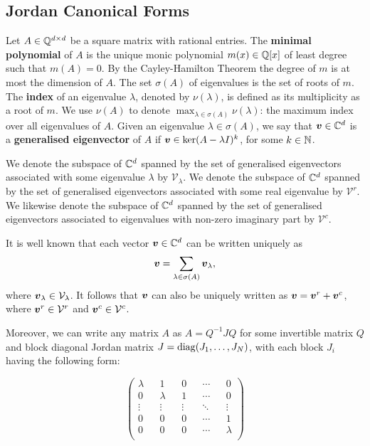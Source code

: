 \subsection{Jordan Canonical Forms}

Let $A \in \mathbb{Q}^{d \times d}$ be a square matrix with rational
entries.  The \textbf{minimal polynomial} of $A$ is the unique monic
polynomial $m(x) \in \mathbb{Q}[x]$ of least degree such that
$m(A)=0$.  By the Cayley-Hamilton Theorem the degree of $m$ is at most
the dimension of $A$. The set $\sigma(A)$ of eigenvalues is the set of
roots of $m$.  The \textbf{index} of an eigenvalue $\lambda$, denoted
by $\nu(\lambda)$, is defined as its multiplicity as a root of $m$. We
use $\nu(A)$ to denote $\max_{\lambda\in\sigma(A)} \nu(\lambda)$: the
maximum index over all eigenvalues of $A$.  Given an eigenvalue
$\lambda \in \sigma(A)$, we say that $\boldsymbol{v} \in \mathbb{C}^{d}$
is a \textbf{generalised eigenvector} of $A$ if
$\boldsymbol{v}\in \ker(A-\lambda I)^{k}$, for some $k\in\mathbb{N}$.

We denote the subspace of $\mathbb{C}^{d}$ spanned by the set of
generalised eigenvectors associated with some eigenvalue $\lambda$ by
$\mathcal{V}_{\lambda}$. We denote the subspace of $\mathbb{C}^{d}$
spanned by the set of generalised eigenvectors associated with some
real eigenvalue by $\mathcal{V}^{r}$.  We likewise denote the subspace
of $\mathbb{C}^{d}$ spanned by the set of generalised eigenvectors
associated to eigenvalues with non-zero imaginary part by
$\mathcal{V}^{c}$.

It is well known that each vector $\boldsymbol{v}\in\mathbb{C}^{d}$
can be written uniquely as
\begin{equation*}
\boldsymbol{v}=\displaystyle{
  \sum\limits_{\lambda\in\sigma(A)}\boldsymbol{v}_{\lambda}},
\end{equation*}
where $\boldsymbol{v}_{\lambda}\in\mathcal{V}_{\lambda}$.
It follows that $\boldsymbol{v}$ can also be uniquely written as
$\boldsymbol{v}=\boldsymbol{v}^{r}+\boldsymbol{v}^{c}$, where
$\boldsymbol{v}^{r} \in\mathcal{V}^{r}$ and
$\boldsymbol{v}^{c} \in\mathcal{V}^{c}$.

Moreover, we can write any matrix $A$ as $A=Q^{-1}JQ$ for some
invertible matrix $Q$ and block diagonal Jordan matrix
$J=\operatorname{diag}(J_{1},\ldots,J_{N})$, with each block $J_{i}$ having the
following form:

\begin{equation*}
\begin{pmatrix}
\lambda	&&	1		&&	0		&&	\cdots	&&	0		\\
0		&&	\lambda	&&	1		&&	\cdots	&&	0		\\
\vdots	&&	\vdots	&&	\vdots	&&	\ddots	&&	\vdots	\\
0		&&	0		&&	0		&&	\cdots	&&	1		\\
0		&&	0		&&	0		&&	\cdots	&&	\lambda	\\
\end{pmatrix}
\end{equation*}


